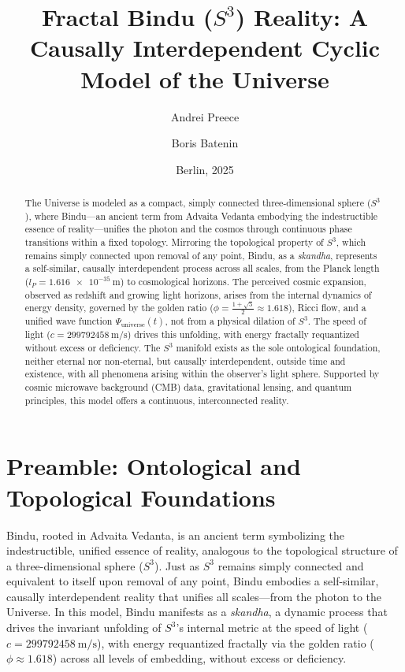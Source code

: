 \documentclass[11pt]{article}
\title{Fractal Bindu ($S^3$) Reality: A Causally Interdependent Cyclic Model of the Universe}
\author{Andrei Preece \and Boris Batenin}
\date{Berlin, 2025}
\begin{document}
\maketitle

\begin{abstract}
The Universe is modeled as a compact, simply connected three-dimensional sphere ($S^3$), where Bindu---an ancient term from Advaita Vedanta embodying the indestructible essence of reality---unifies the photon and the cosmos through continuous phase transitions within a fixed topology. Mirroring the topological property of $S^3$, which remains simply connected upon removal of any point, Bindu, as a \textit{skandha}, represents a self-similar, causally interdependent process across all scales, from the Planck length ($l_P = \SI{1.616e-35}{\meter}$) to cosmological horizons. The perceived cosmic expansion, observed as redshift and growing light horizons, arises from the internal dynamics of energy density, governed by the golden ratio ($\phi = \frac{1 + \sqrt{5}}{2} \approx 1.618$), Ricci flow, and a unified wave function $\Psi_{\text{universe}}(t)$, not from a physical dilation of $S^3$. The speed of light ($c = \SI{299792458}{\meter\per\second}$) drives this unfolding, with energy fractally requantized without excess or deficiency. The $S^3$ manifold exists as the sole ontological foundation, neither eternal nor non-eternal, but causally interdependent, outside time and existence, with all phenomena arising within the observer's light sphere. Supported by cosmic microwave background (CMB) data, gravitational lensing, and quantum principles, this model offers a continuous, interconnected reality.
\end{abstract}

\section{Preamble: Ontological and Topological Foundations}
Bindu, rooted in Advaita Vedanta, is an ancient term symbolizing the indestructible, unified essence of reality, analogous to the topological structure of a three-dimensional sphere ($S^3$). Just as $S^3$ remains simply connected and equivalent to itself upon removal of any point, Bindu embodies a self-similar, causally interdependent reality that unifies all scales---from the photon to the Universe. In this model, Bindu manifests as a \textit{skandha}, a dynamic process that drives the invariant unfolding of $S^3$’s internal metric at the speed of light ($c = \SI{299792458}{\meter\per\second}$), with energy requantized fractally via the golden ratio ($\phi \approx 1.618$) across all levels of embedding, without excess or deficiency.
\end{document}

